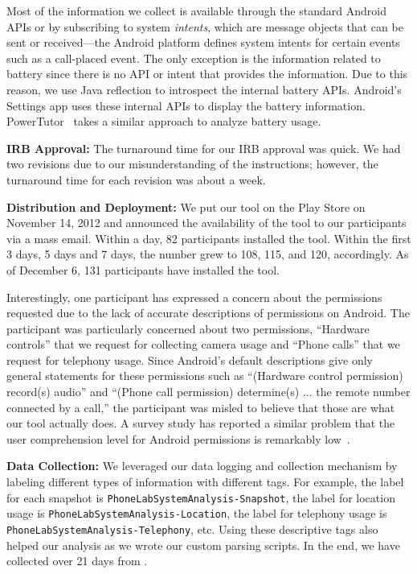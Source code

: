 Most of the information we collect is available through the standard Android
APIs or by subscribing to system {\it intents}, which are message objects that
can be sent or received---the Android platform defines system intents for
certain events such as a call-placed event. The only exception is the
information related to battery since there is no API or intent that provides the
information. Due to this reason, we use Java reflection to introspect the
internal battery APIs. Android's Settings app uses these internal APIs to
display the battery information. PowerTutor~\cite{zhang:codes:2010} takes a
similar approach to analyze battery usage.

{\bf IRB Approval:} The turnaround time for our IRB approval
was quick. We had two revisions due to our misunderstanding of the instructions;
however, the turnaround time for each revision was about a week.

{\bf Distribution and Deployment:} We put our tool on the Play Store on
November 14, 2012 and announced the availability of the tool to our
participants via a mass email. Within a day, 82 participants installed the
tool. Within the first 3 days, 5 days and 7 days, the number grew to 108,
115, and 120, accordingly. As of December 6, 131 participants have installed the
tool. 

Interestingly, one participant has expressed a concern about the permissions
requested due to the lack of accurate descriptions of permissions on Android.
The participant was particularly concerned about two permissions, ``Hardware
controls'' that we request for collecting camera usage and ``Phone calls'' that
we request for telephony usage. Since Android's default descriptions give only
general statements for these permissions such as ``(Hardware control permission)
record(s) audio'' and ``(Phone call permission) determine(s) ... the remote
number connected by a call,'' the participant was misled to believe that those
are what our tool actually does. A survey study has reported a similar problem
that the user comprehension level for Android permissions is remarkably
low~\cite{felt:soups:2012}.

{\bf Data Collection:} We leveraged our data logging and collection mechanism by
labeling different types of information with different tags. For example, the
label for each snapshot is \texttt{PhoneLabSystemAnalysis-Snapshot}, the label
for location usage is \texttt{PhoneLabSystemAnalysis-Location}, the label for
telephony usage is \texttt{PhoneLabSystemAnalysis-Telephony}, etc. Using these
descriptive tags also helped our analysis as we wrote our custom parsing
scripts. In the end, we have collected  over 21 days from .
